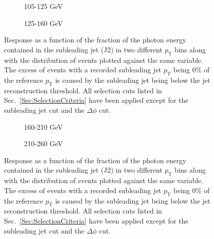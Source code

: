 \begin{figure}[!ht]
  \centering
  \begin{subfigure}{.5\textwidth}
    \centering
    \caption{105-125 GeV}
  \end{subfigure}%
  \begin{subfigure}{.5\textwidth}
    \centering
    \caption{125-160 GeV}
  \end{subfigure}
  \caption[Response as a function of the subleading jet cut, 105-125 and 125-160 GeV bins]
  {\small Response as a function of the fraction of the photon energy contained in the subleading jet (J2) in two different $p_{\mathrm T}$ bins along with the distribution of events plotted against the same variable.  The excess of events with a recorded subleading jet $p_{\mathrm T}$ being 0\% of the reference $p_{\mathrm T}$ is caused by the subleading jet being below the jet reconstruction threshold.  All selection cuts listed in Sec.~\ref{Sec:SelectionCriteria} have been applied except for the subleading jet cut and the $\Delta\phi$ cut.  }
  \label{plot:GJetEMJ2105-125_2016App}
\end{figure}

\begin{figure}[!ht]
  \centering
  \begin{subfigure}{.5\textwidth}
    \centering
    \caption{160-210 GeV}
  \end{subfigure}%
  \begin{subfigure}{.5\textwidth}
    \centering
    \caption{210-260 GeV}
  \end{subfigure}
   \caption[Response as a function of the subleading jet cut, 160-210 and 210-260 GeV bins]
  {\small Response as a function of the fraction of the photon energy contained in the subleading jet (J2) in two different $p_{\mathrm T}$ bins along with the distribution of events plotted against the same variable.  The excess of events with a recorded subleading jet $p_{\mathrm T}$ being 0\% of the reference $p_{\mathrm T}$ is caused by the subleading jet being below the jet reconstruction threshold.  All selection cuts listed in Sec.~\ref{Sec:SelectionCriteria} have been applied except for the subleading jet cut and the $\Delta\phi$ cut.  }
  \label{plot:GJetEMJ2160-210_2016App}
\end{figure}


